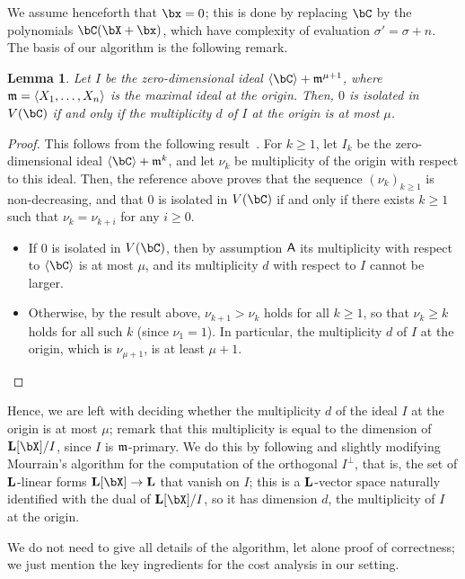 \documentclass[12pt]{article}
\newtheorem{lemma}[definition]{Lemma}
\begin{document}
We assume henceforth that $\bx=0$; this is
done by replacing $\bC$ by the polynomials $\bC(\bX+\bx)$, which have
complexity of evaluation $\sigma'=\sigma+n$.  The basis of our algorithm is the
following remark.

\begin{lemma}
  Let $I$ be the zero-dimensional ideal
  $\langle \bC \rangle + \m^{\mu+1}$, where
  $\mathfrak{m}=\langle X_1,\dots,X_n\rangle$ is the maximal ideal at the
  origin. Then, $0$ is isolated in $V(\bC)$ if and only if the
  multiplicity $d$ of $I$ at the origin is at most $\mu$.
\end{lemma}
\begin{proof}
  This follows from the following
  result~\cite[Theorem~A.1]{BaHaPeSo09}.  For $k \ge 1$, let $I_k$ be
  the zero-dimensional ideal $\langle \bC \rangle + \m^{k}$, and let
  $\nu_k$ be multiplicity of the origin with respect to this
  ideal. Then, the reference above proves that the sequence
  $(\nu_k)_{k \ge 1}$ is non-decreasing, and that $0$ is isolated in
  $V(\bC)$ if and only if there exists $k\ge 1$ such that
  $\nu_k=\nu_{k+i}$ for any $i\geq 0$.
  \begin{itemize}
  \item If $0$ is isolated in $V(\bC)$, then by assumption $\mathsf{A}$ 
    its multiplicity with respect to $\langle \bC\rangle$ is at most $\mu$,
    and its multiplicity $d$ with respect to $I$ cannot be larger.
  \item Otherwise, by the result above, $\nu_{k+1} > \nu_k$ holds for
    all $k \ge 1$, so that $\nu_k \ge k$ holds for all such $k$ (since
    $\nu_1=1$). In particular, the multiplicity $d$ of 
 $I$ at the origin, which is $\nu_{\mu+1}$, is at least $\mu+1$.
    \qedhere
  \end{itemize}
\end{proof}

Hence, we are left with deciding whether the multiplicity $d$ of the
ideal $I$ at the origin is at most $\mu$; remark that this
multiplicity is equal to the dimension of $\LL[\bX]/I$, since $I$ is
$\mathfrak{m}$-primary.  We do this by following and slightly modifying
Mourrain's algorithm for the computation of the orthogonal
$I^{\perp}$, that is, the set of $\mathbf{L}$-linear forms $\LL[\bX] \to \LL$
that vanish on $I$; this is a $\mathbf{L}$-vector space naturally identified
with the dual of $\LL[\bX]/I$, so it has dimension $d$, the
multiplicity of $I$ at the origin.

We do not need to give all details of the algorithm, let alone proof
of correctness; we just mention the key ingredients for the cost
analysis in our setting. 
\end{document}
